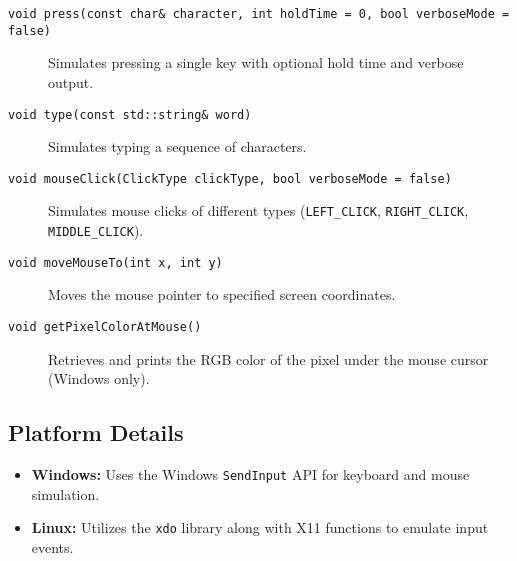 \begin{description}
	\item[\texttt{void press(const char\& character, int holdTime = 0, bool verboseMode = false)}]  
	Simulates pressing a single key with optional hold time and verbose output.
	
	\item[\texttt{void type(const std::string\& word)}]  
	Simulates typing a sequence of characters.
	
	\item[\texttt{void mouseClick(ClickType clickType, bool verboseMode = false)}]  
	Simulates mouse clicks of different types (\texttt{LEFT\_CLICK}, \texttt{RIGHT\_CLICK}, \texttt{MIDDLE\_CLICK}).
	
	\item[\texttt{void moveMouseTo(int x, int y)}]  
	Moves the mouse pointer to specified screen coordinates.
	
	\item[\texttt{void getPixelColorAtMouse()}]  
	Retrieves and prints the RGB color of the pixel under the mouse cursor (Windows only).
\end{description}

\subsection{Platform Details}

\begin{itemize}\itemsep0em
	\item \textbf{Windows:} Uses the Windows \texttt{SendInput} API for keyboard and mouse simulation.

	\item \textbf{Linux:} Utilizes the \texttt{xdo} library along with X11 functions to emulate input events.
\end{itemize}



















